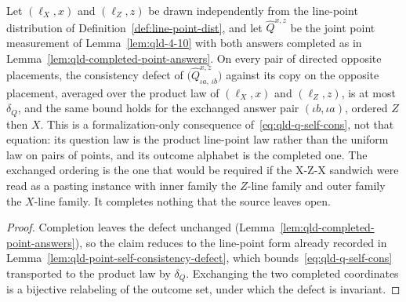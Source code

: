 \begin{lemma}
	\label{lem:qld-completed-point-self-consistency}
	\leanok
	Let $(\ell_X, x)$ and $(\ell_Z, z)$ be drawn independently from the
	line-point distribution of Definition~\ref{def:line-point-dist}, and let
	$\hat{Q}^{x,z}$ be the joint point measurement of
	Lemma~\ref{lem:qld-4-10} with both answers completed as in
	Lemma~\ref{lem:qld-completed-point-answers}. On every pair of directed
	opposite placements, the consistency defect of
	$\big(\hat{Q}^{x,z}_{\iota a,\,\iota b}\big)$ against its copy on the
	opposite placement, averaged over the product law of $(\ell_X,x)$ and
	$(\ell_Z,z)$, is at most $\delta_Q$, and the same bound holds for the
	exchanged answer pair $(\iota b, \iota a)$, ordered $Z$ then $X$.
	This is a formalization-only consequence
	of~\eqref{eq:qld-q-self-cons}, not that equation: its question law is the
	product line-point law rather than the uniform law on pairs of points, and
	its outcome alphabet is the completed one. The exchanged ordering is the
	one that would be required if the X-Z-X sandwich were read as a pasting
	instance with inner family the $Z$-line family and outer family the
	$X$-line family. It completes nothing that the source leaves open.
\end{lemma}
\begin{proof}
	\leanok
	Completion leaves the defect unchanged
	(Lemma~\ref{lem:qld-completed-point-answers}), so the claim reduces to the
	line-point form already recorded in
	Lemma~\ref{lem:qld-point-self-consistency-defect}, which
	bounds~\eqref{eq:qld-q-self-cons} transported to the product law by
	$\delta_Q$. Exchanging the two completed coordinates is a bijective
	relabeling of the outcome set, under which the defect is invariant.
\end{proof}

